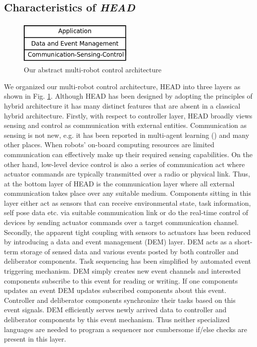 \documentclass{ifacconf}
\begin{document}
\subsection{Characteristics of {\em HEAD}}
\begin{figure}
\begin{center}
\includegraphics[width=5.5cm,height=2.1cm]{./dia-files/abstract-arch} %
\caption{Our abstract multi-robot control architecture} 
\label{fig:abstract-arch}
\end{center}
\end{figure}
We organized our  multi-robot control architecture, HEAD into three layers as shown in Fig. \ref{fig:abstract-arch}. Although HEAD has been designed by adopting the principles of hybrid architecture it has many distinct features that are absent in a classical hybrid architecture. Firstly, with respect to controller layer, HEAD broadly views sensing and control as communication with external entities. Communication as sensing is not new, e.g. it has been reported in multi-agent learning (\cite{Mataric1998}) and many other places. When robots' on-board computing resources are limited communication can effectively make up their required sensing capabilities. On the other hand, low-level device control is also a series of communication act where actuator commands are typically transmitted over a radio or physical link. Thus, at the bottom layer of HEAD is the communication layer where all external communication takes place over any suitable medium. Components sitting in this layer either act as sensors that can receive environmental state, task information, self pose data etc. via suitable communication link or do the real-time control of devices by sending actuator commands over a target communication channel. \\
Secondly, the apparent tight coupling with sensors to actuators has been reduced by introducing a data and event management (DEM) layer. DEM acts as a short-term storage of sensed data and various events posted by both controller and deliberator components. Task sequencing has been simplified by automated event triggering mechanism. DEM simply creates new event channels and interested components subscribe to this event for reading or writing. If one components updates an event DEM updates subscribed components about this event. Controller and deliberator components synchronize their tasks based on this event signals. DEM efficiently serves newly arrived data to controller and deliberator components by this event mechanism. Thus neither specialized languages are needed to program a sequencer nor cumbersome if/else checks are present in this layer.\\
\end{document}
